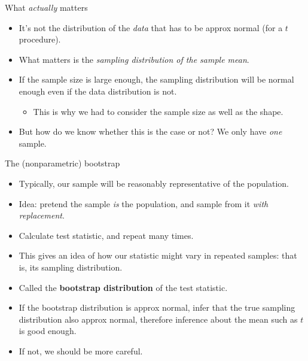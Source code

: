 \documentclass[
  ignorenonframetext,
]{beamer}
\providecommand{\tightlist}{%
  \setlength{\itemsep}{0pt}\setlength{\parskip}{0pt}}
\begin{document}
\begin{frame}{What \emph{actually} matters}
\protect\hypertarget{what-actually-matters}{}

\begin{itemize}
\tightlist
\item
  It's not the distribution of the \emph{data} that has to be approx
  normal (for a \(t\) procedure).
\item
  What matters is the \emph{sampling distribution of the sample mean}.
\item
  If the sample size is large enough, the sampling distribution will be
  normal enough even if the data distribution is not.

  \begin{itemize}
  \tightlist
  \item
    This is why we had to consider the sample size as well as the shape.
  \end{itemize}
\item
  But how do we know whether this is the case or not? We only have
  \emph{one} sample.
\end{itemize}

\end{frame}

\begin{frame}{The (nonparametric) bootstrap}
\protect\hypertarget{the-nonparametric-bootstrap}{}

\begin{itemize}
\tightlist
\item
  Typically, our sample will be reasonably representative of the
  population.
\item
  Idea: pretend the sample \emph{is} the population, and sample from it
  \emph{with replacement}.
\item
  Calculate test statistic, and repeat many times.
\item
  This gives an idea of how our statistic might vary in repeated
  samples: that is, its sampling distribution.
\item
  Called the \textbf{bootstrap distribution} of the test statistic.
\item
  If the bootstrap distribution is approx normal, infer that the true
  sampling distribution also approx normal, therefore inference about
  the mean such as \(t\) is good enough.
\item
  If not, we should be more careful.
\end{itemize}

\end{frame}
\end{document}
